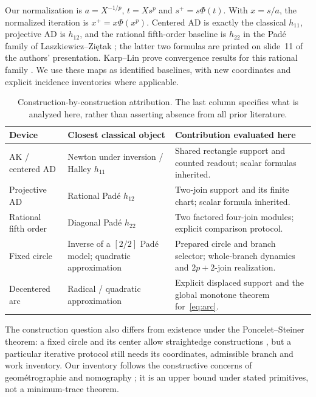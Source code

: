 \documentclass[11pt,a4paper]{article}
\begin{document}
Our normalization is $a=X^{-1/p}$, $t=Xs^p$ and $s^+=s\Phi(t)$. With $x=s/a$, the normalized iteration is $x^+=x\Phi(x^p)$. Centered AD is exactly the classical $h_{11}$, projective AD is $h_{12}$, and the rational fifth-order baseline is $h_{22}$ in the Pad\'e family of Laszkiewicz--Zi\k{e}tak \cite{laszkiewicz2009,zietakSlides2009}; the latter two formulas are printed on slide~11 of the authors' presentation. Karp--Lin prove convergence results for this rational family \cite{karp2011}. We use these maps as identified baselines, with new coordinates and explicit incidence inventories where applicable.

\begin{table}[H]\centering\small
\caption{Construction-by-construction attribution. The last column specifies what is analyzed here, rather than asserting absence from all prior literature.}
\begin{tabularx}{\linewidth}{@{}p{.20\linewidth}p{.32\linewidth}X@{}}\toprule
Device & Closest classical object & Contribution evaluated here\\\midrule
AK / centered AD & Newton under inversion / Halley $h_{11}$ & Shared rectangle support and counted readout; scalar formulas inherited.\\
Projective AD & Rational Pad\'e $h_{12}$ & Two-join support and its finite chart; scalar formula inherited.\\
Rational fifth order & Diagonal Pad\'e $h_{22}$ & Two factored four-join modules; explicit comparison protocol.\\
Fixed circle & Inverse of a $[2/2]$ Pad\'e model; quadratic approximation & Prepared circle and branch selector; whole-branch dynamics and $2p+2$-join realization.\\
Decentered arc & Radical / quadratic approximation & Explicit displaced support and the global monotone theorem for~\eqref{eq:arc}.\\\bottomrule
\end{tabularx}\end{table}
The construction question also differs from existence under the Poncelet--Steiner theorem: a fixed circle and its center allow straightedge constructions \cite{steiner1833}, but a particular iterative protocol still needs its coordinates, admissible branch and work inventory. Our inventory follows the constructive concerns of geom\'etrographie and nomography \cite{lemoine1902,docagne1925}; it is an upper bound under stated primitives, not a minimum-trace theorem.
\end{document}

